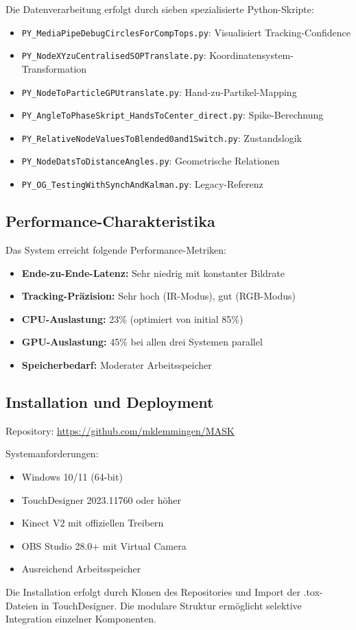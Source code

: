 Die Datenverarbeitung erfolgt durch sieben spezialisierte Python-Skripte:

\begin{itemize}
    \item \texttt{PY\_MediaPipeDebugCirclesForCompTops.py}: Visualisiert Tracking-Confidence
    \item \texttt{PY\_NodeXYzuCentralisedSOPTranslate.py}: Koordinatensystem-Transformation
    \item \texttt{PY\_NodeToParticleGPUtranslate.py}: Hand-zu-Partikel-Mapping
    \item \texttt{PY\_AngleToPhaseSkript\_HandsToCenter\_direct.py}: Spike-Berechnung
    \item \texttt{PY\_RelativeNodeValuesToBlended0and1Switch.py}: Zustandslogik
    \item \texttt{PY\_NodeDatsToDistanceAngles.py}: Geometrische Relationen
    \item \texttt{PY\_OG\_TestingWithSynchAndKalman.py}: Legacy-Referenz
\end{itemize}

\subsection*{Performance-Charakteristika}


Das System erreicht folgende Performance-Metriken:
\begin{itemize}
    \item \textbf{Ende-zu-Ende-Latenz:} Sehr niedrig mit konstanter Bildrate
    \item \textbf{Tracking-Präzision:} Sehr hoch (IR-Modus), gut (RGB-Modus)
    \item \textbf{CPU-Auslastung:} 23\% (optimiert von initial 85\%)
    \item \textbf{GPU-Auslastung:} 45\% bei allen drei Systemen parallel
    \item \textbf{Speicherbedarf:} Moderater Arbeitsspeicher
\end{itemize}

\subsection*{Installation und Deployment}

Repository: \url{https://github.com/mklemmingen/MASK}

Systemanforderungen:
\begin{itemize}
    \item Windows 10/11 (64-bit)
    \item TouchDesigner 2023.11760 oder höher
    \item Kinect V2 mit offiziellen Treibern
    \item OBS Studio 28.0+ mit Virtual Camera
    \item Ausreichend Arbeitsspeicher
\end{itemize}

Die Installation erfolgt durch Klonen des Repositories und Import der .tox-Dateien in TouchDesigner. Die modulare Struktur ermöglicht selektive Integration einzelner Komponenten.